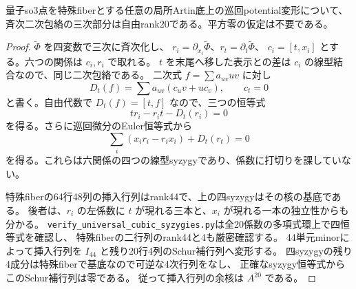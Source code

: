 \begin{proposition}[巡回potential上の四syzygyは全Artin底で持ち上がる]
\label{prop:universal-four-syzygies}
量子so3点を特殊fiberとする任意の局所Artin底上の巡回potential変形について、
斉次二次包絡の三次部分は自由rank20である。平方零の仮定は不要である。
\end{proposition}
\begin{proof}
$\widetilde\Phi$ を四変数で三次に斉次化し、
$r_i=\partial_{x_i}\widetilde\Phi$、$r_t=\partial_t\widetilde\Phi$、
$c_i=[t,x_i]$ とする。六つの関係は $c_i,r_i$ で取れる。
$t$ を末尾へ移した表示との差は $c_i$ の線型結合なので、同じ二次包絡である。
二次式 $f=\sum a_{uv}uv$ に対し
\[
 D_t(f)=\sum a_{uv}(c_u v+u c_v),\qquad c_t=0
\]
と書く。自由代数で $D_t(f)=[t,f]$ なので、三つの恒等式
\[
 t r_i-r_i t-D_t(r_i)=0
\]
を得る。さらに巡回微分のEuler恒等式から
\[
 \sum_i(x_i r_i-r_i x_i)+D_t(r_t)=0
\]
を得る。これらは六関係の四つの線型syzygyであり、係数に打切りを課していない。

特殊fiberの64行48列の挿入行列はrank44で、上の四syzygyはその核の基底である。
後者は、$r_i$ の左係数に $t$ が現れる三本と、$x_i$ が現れる一本の独立性からも分かる。
\texttt{verify\_universal\_cubic\_syzygies.py}は全20係数の多項式環上で四恒等式を確認し、
特殊fiberの二行列のrank44と4も厳密確認する。
44単元minorによって挿入行列を $I_{44}$ と残り20行4列のSchur補行列へ変形する。
四syzygyの残り4成分は特殊fiberで基底なので可逆な4次行列をなし、
正確なsyzygy恒等式からこのSchur補行列は零である。
従って挿入行列の余核は $A^{20}$ である。
\end{proof}

